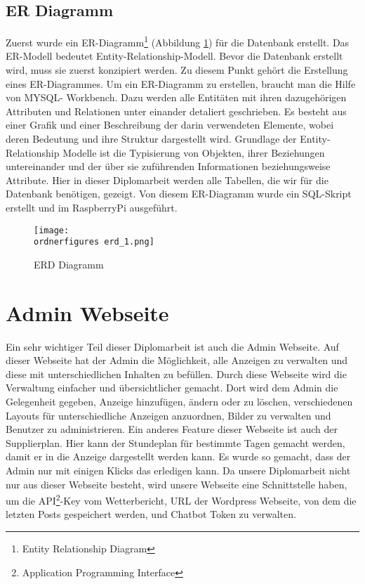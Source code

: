 \subsection{ER Diagramm}
Zuerst wurde ein ER-Diagramm\footnote{Entity Relationship Diagram} (Abbildung \ref{fi:erd}) für die Datenbank erstellt. Das ER-Modell bedeutet Entity-Relationship-Modell. Bevor die Datenbank erstellt wird, muss sie zuerst konzipiert werden. Zu diesem Punkt gehört die Erstellung eines ER-Diagrammes. Um ein ER-Diagramm zu erstellen, braucht man die Hilfe von MYSQL- Workbench. Dazu werden alle Entitäten mit ihren dazugehörigen Attributen und Relationen unter einander detaliert geschrieben. Es besteht aus einer Grafik und einer Beschreibung der darin verwendeten Elemente, wobei deren Bedeutung und ihre Struktur dargestellt wird. Grundlage der Entity-Relationship Modelle ist die Typisierung von Objekten, ihrer Beziehungen untereinander und der über sie zuführenden Informationen beziehungsweise Attribute. Hier in dieser Diplomarbeit werden alle Tabellen, die wir für die Datenbank benötigen, gezeigt. Von diesem ER-Diagramm wurde ein SQL-Skript erstellt und im RaspberryPi ausgeführt.

\begin{figure}[H]
	\centering
	\texttt{[image: \\ordnerfigures erd\_1.png]}
	\caption{ERD Diagramm}
	\label{fi:erd}
\end{figure}

\section{Admin Webseite}
Ein sehr wichtiger Teil dieser Diplomarbeit ist auch die Admin Webseite. Auf dieser Webseite hat der Admin die M\"{o}glichkeit, alle Anzeigen zu verwalten und diese mit unterschiedlichen Inhalten zu bef\"{u}llen. Durch diese Webseite wird die Verwaltung einfacher und \"{u}bersichtlicher gemacht. Dort wird dem Admin die Gelegenheit gegeben, Anzeige hinzuf\"{u}gen, \"{a}ndern oder zu l\"{o}schen, verschiedenen Layouts f\"{u}r unterschiedliche Anzeigen anzuordnen, Bilder zu verwalten und Benutzer zu administrieren. Ein anderes Feature dieser Webseite ist auch der Supplierplan. Hier kann der Stundeplan f\"{u}r bestimmte Tagen gemacht werden, damit er in die Anzeige dargestellt werden kann. Es wurde so gemacht, dass der Admin nur mit einigen Klicks das erledigen kann. Da unsere Diplomarbeit nicht nur aus dieser Webseite besteht, wird unsere Webseite eine Schnittstelle haben, um die API\footnote{Application Programming Interface}-Key vom Wetterbericht, URL der Wordpress Webseite, von dem die letzten Posts gespeichert werden, und Chatbot Token zu verwalten.


